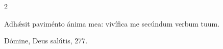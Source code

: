\documentclass[9pt,twoside]{extarticle}
\begin{document}
\begin{multicols}{2}
%
%
%
%
%
%
%

\begin{tightlist}{}
\item {} Adhǽsit paviménto ánima mea: vivífica me secúndum verbum tuum.
\item {} Dómine, Deus salútis, 277.
\end{tightlist}


\end{multicols}
\end{document}
